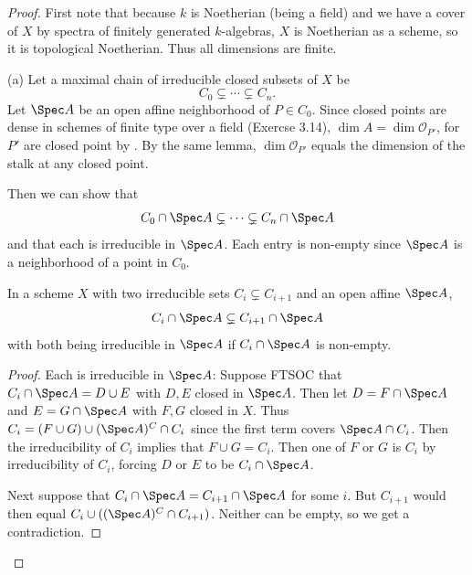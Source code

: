 \begin{proof}
	First note that because $k $ is Noetherian (being a field) and we have a cover of $X $ by spectra of finitely generated $k $-algebras, $X $ is Noetherian as a scheme, so it is topological Noetherian.
	Thus all dimensions are finite.

	(a)
	Let a maximal chain of irreducible closed subsets of $X $ be
	\[
		C_{0} \subsetneq \cdots \subsetneq C_n
	.\]
	Let $\Spec A $ be an open affine neighborhood of $P\in C_0$.
	Since closed points are dense in schemes of finite type over a field (Exercse 3.14), $\dim A = \dim \mathcal{O}_{P'} $, for $P' $ are closed point by .
	By the same lemma, $\dim \mathcal{O}_{P'} $ equals the dimension of the stalk at any closed point.

	Then we can show that
	\[
		C_{0} \cap \Spec A \subsetneq \cdots \subsetneq C_n \cap \Spec A
	\]
	and that each is irreducible in $\Spec A $.
	Each entry is non-empty since $\Spec A $ is a neighborhood of a point in $C_{0} $.

	\begin{lem}\label{lem:irreducibleaffine}
		In a scheme $X $ with two irreducible sets $C_i \subsetneq C_{i+1} $ and an open affine $\Spec A $,
		\[
			C_i\cap \Spec A \subsetneq C_{i+1} \cap \Spec A
		\]
		with both being irreducible in $\Spec A $ if $C_i \cap \Spec A $ is non-empty.
	\end{lem}
	\begin{proof}
		Each is irreducible in $\Spec A $:
		Suppose FTSOC that $C_i \cap \Spec A = D\cup E $ with $D,E $ closed in $\Spec A $.
		Then let $D=F\cap \Spec A $ and $E = G\cap \Spec A $ with $F,G $ closed in $X $.
		Thus $C_i = (F \cup G) \cup (\Spec A)^C\cap C_i $ since the first term covers $\Spec A \cap C_i$.
		Then the irreducibility of $C_i $ implies that $F\cup G= C_i$.
		Then one of $F $ or $G $ is $C_i $ by irreducibility of $C_i $, forcing $D $ or $E $ to be $C_i\cap \Spec A $.

		Next suppose that $C_{i} \cap \Spec A = C_{i+1}\cap \Spec A $ for some $i $.
		But $C_{i+1} $ would then equal $C_{i} \cup ((\Spec A)^C\cap C_{i+1}) $.%
		Neither can be empty, so we get a contradiction.
	\end{proof}


\end{proof}
